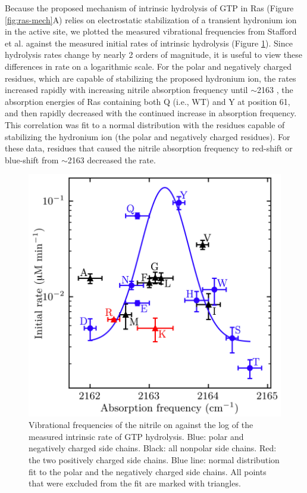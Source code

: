 Because the proposed mechanism of intrinsic hydrolysis of GTP in Ras (Figure \ref{fig:ras-mech}A) relies on electrostatic stabilization of a transient hydronium ion in the active site, we plotted the measured vibrational frequencies from Stafford et al.\cite{Stafford2012} against the measured initial rates of intrinsic hydrolysis (Figure \ref{fig:ras-stark_vs_rate}). 
Since hydrolysis rates change by nearly 2 orders of magnitude, it is useful to view these differences in rate on a logarithmic scale. 
For the polar and negatively charged residues, which are capable of stabilizing the proposed hydronium ion, the rates increased rapidly with increasing nitrile absorption frequency until $\sim$2163 \si{\wn}, the absorption energies of Ras containing both Q (i.e., WT) and Y at position 61, and then rapidly decreased with the continued increase in absorption frequency. 
This correlation was fit to a normal distribution with the residues capable of stabilizing the hydronium ion (the polar and negatively charged residues). 
For these data, residues that caused the nitrile absorption frequency to red-shift or blue-shift from $\sim$2163 \si{\wn} decreased the rate.

\begin{figure}
    \center
    \includegraphics[width=\single]{figures-ras/Figure4.png}
    \caption[Vibrational frequencies compared to the measured intrinsic rate of hydrolysis]{
        Vibrational frequencies of the nitrile on \RalBSCN{} against the log of the measured intrinsic rate of GTP hydrolysis. 
        Blue: polar and negatively charged side chains. Black: all nonpolar side chains. 
        Red: the two positively charged side chains. Blue line: normal distribution fit to the polar and the negatively charged side chains. 
        All points that were excluded from the fit are marked with triangles.
    }
    \label{fig:ras-stark_vs_rate}
\end{figure}

